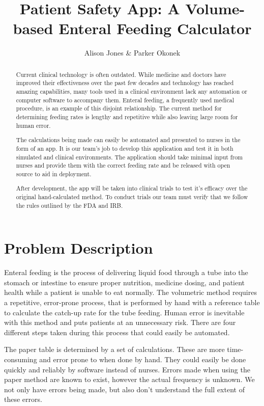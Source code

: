 \documentclass[fullpage,10pt, onecolumn, draftclsnofoot]{IEEEtran}
\begin{document}
\title{Patient Safety App: A Volume-based Enteral Feeding Calculator}
\author{Alison Jones \& Parker Okonek}
 \maketitle
 \begin{abstract}
 Current clinical technology is often outdated. While medicine and doctors have improved their 
effectiveness over the past few decades and technology has reached amazing capabilities, 
many tools used in a clinical environment lack any automation or computer software to
accompany them.  Enteral feeding, a frequently used medical procedure, is an example of 
this disjoint relationship. The current method for determining feeding rates is lengthy and repetitive
while also leaving large room for human error. 

The calculations being made
can easily be automated and presented to nurses in the form of an app. It is our team's job to
develop this application and test it in both simulated and clinical environments. The application
should take minimal input from nurses and provide them with the correct feeding rate and
be released with open source to aid in deployment.

After development, the app will be taken into clinical
 trials to test it's efficacy over the original hand-calculated method. To conduct trials our team
 must verify that we follow the rules outlined by the FDA and IRB.
 \end{abstract}
\newpage
\section{Problem Description}
Enteral feeding is the process of delivering  liquid  food through a tube into the 
stomach or intestine to ensure proper nutrition, medicine dosing, and patient health while
a patient is unable to eat normally. The volumetric method requires a repetitive, error-prone process, that is performed
by hand with a reference table to calculate the catch-up rate for the tube feeding.  Human error is inevitable with this method and puts patients at an unnecessary risk. There are four different steps taken during this process that could easily be automated.

The paper table is determined by a set of calculations. These are more time-consuming and error prone to when done by hand. They could easily be done quickly and reliably by software instead of nurses. Errors made when using the paper method are known to exist, however the actual frequency is unknown.
We not only have errors being made, but also don't understand the full extent of these errors. 
\end{document}
